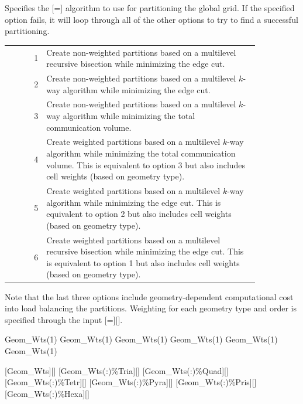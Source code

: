 \begin{nmldescbody}
Specifies the [=] algorithm to use for
partitioning the global grid. If the specified option fails, it will
loop through all of the other options to try to find a successful partitioning.

\begin{longtable}{ @{} r @{ = } p{0.85\linewidth} @{} }
  1 & Create non-weighted partitions based on a multilevel recursive bisection
      while minimizing the edge cut.
      \\
  2 & Create non-weighted partitions based on a multilevel $k$-way algorithm
      while minimizing the edge cut.
      \\
  3 & Create non-weighted partitions based on a multilevel $k$-way algorithm
      while minimizing the total communication volume.
      \\
  4 & Create weighted partitions based on a multilevel $k$-way algorithm
      while minimizing the total communication volume.
      This is equivalent to option 3 but also
      includes cell weights (based on geometry type).
      \\
  5 & Create weighted partitions based on a multilevel $k$-way algorithm
      while minimizing the edge cut.
      This is equivalent to option 2 but also
      includes cell weights (based on geometry type).
      \\
  6 & Create weighted partitions based on a multilevel recursive bisection
      while minimizing the edge cut.
      This is equivalent to option 1 but also
      includes cell weights (based on geometry type).
\end{longtable}

Note that the last three options include geometry-dependent
computational cost into load balancing the partitions.
%
Weighting for each geometry type and order is specified through the input
[=][].

\end{nmldescbody}


\begin{nmldescitem}
Geom_Wts(1)%
Geom_Wts(1)%
Geom_Wts(1)%
Geom_Wts(1)%
Geom_Wts(1)%
Geom_Wts(1)%
\end{nmldescitem}
[Geom\_Wts][]
[Geom\_Wts(:)\%Tria][]
[Geom\_Wts(:)\%Quad][]
[Geom\_Wts(:)\%Tetr][]
[Geom\_Wts(:)\%Pyra][]
[Geom\_Wts(:)\%Pris][]
[Geom\_Wts(:)\%Hexa][]

